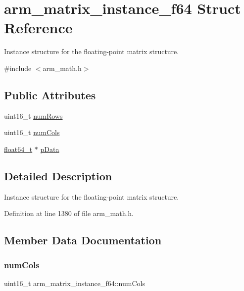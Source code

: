 \hypertarget{structarm__matrix__instance__f64}{}\section{arm\+\_\+matrix\+\_\+instance\+\_\+f64 Struct Reference}
\label{structarm__matrix__instance__f64}


Instance structure for the floating-\/point matrix structure.  




{\ttfamily \#include $<$arm\+\_\+math.\+h$>$}

\subsection*{Public Attributes}
\begin{DoxyCompactItemize}
\item 
uint16\+\_\+t \hyperlink{structarm__matrix__instance__f64_a8b44d1e5003345047c4ead9e1593bf22}{num\+Rows}
\item 
uint16\+\_\+t \hyperlink{structarm__matrix__instance__f64_ab0f0399aff3201880e2d8a447de9a7ee}{num\+Cols}
\item 
\hyperlink{arm__math_8h_ac55f3ae81b5bc9053760baacf57e47f4}{float64\+\_\+t} $\ast$ \hyperlink{structarm__matrix__instance__f64_a5b2475f8ff1e4818955cdd18bc40a097}{p\+Data}
\end{DoxyCompactItemize}


\subsection{Detailed Description}
Instance structure for the floating-\/point matrix structure. 

Definition at line 1380 of file arm\+\_\+math.\+h.



\subsection{Member Data Documentation}
\mbox{\label{structarm__matrix__instance__f64_ab0f0399aff3201880e2d8a447de9a7ee}} 
\subsubsection{\texorpdfstring{num\+Cols}{numCols}}
{\footnotesize\ttfamily uint16\+\_\+t arm\+\_\+matrix\+\_\+instance\+\_\+f64\+::num\+Cols}


